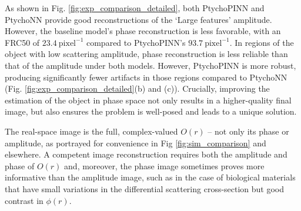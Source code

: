 \documentclass[sn-mathphys]{sn-jnl}%
\theoremstyle{thmstyleone}%
\theoremstyle{thmstyletwo}%
\theoremstyle{thmstylethree}%
\begin{document}
As shown in Fig. \ref{fig:exp_comparison_detailed}, both PtychoPINN and PtychoNN provide good reconstructions of the `Large features' amplitude. However, the baseline model's phase reconstruction is less favorable, with an FRC50 of $23.4~\mathrm{pixel}^{-1}$ compared to PtychoPINN's $93.7~\mathrm{pixel}^{-1}$. In regions of the object with low scattering amplitude, phase reconstruction is less reliable than that of the amplitude under both models. However, PtychoPINN is more robust, producing significantly fewer artifacts in those regions compared to PtychoNN (Fig. \ref{fig:exp_comparison_detailed}(b) and (c)). Crucially, improving the estimation of the object in phase space not only results in a higher-quality final image, but also ensures the problem is well-posed \cite{millane1990phase} and leads to a unique solution.

The real-space image is the full, complex-valued $O(r)$ -- not only its phase or amplitude, as portrayed for convenience in Fig \ref{fig:sim_comparison} and elsewhere. A competent image reconstruction requires both the amplitude and phase of $O(r)$ and, moreover, the phase image sometimes proves more informative than the amplitude image, such as in the case of biological materials that have small variations in the differential scattering cross-section but good contrast in $\phi(r)$.


\end{document}
